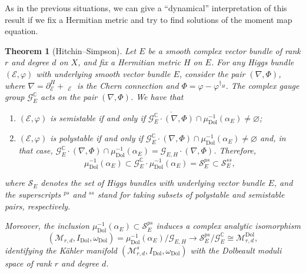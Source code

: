 \documentclass[12pt,a4paper]{amsbook}
\newtheorem{thm}{Theorem}[chapter]
\theoremstyle{remark} \newtheorem{rmk}[thm]{Remark}
\theoremstyle{definition} \newtheorem{defn}[thm]{Definition}
\theoremstyle{definition} \newtheorem{ex}[thm]{Example}
\theoremstyle{definition} \newtheorem{ej}{Exercise}
\newcommand{\C}{\mathbb C}
\newcommand{\cG}{\mathcal G}
\newcommand{\cM}{\mathcal M}
\newcommand{\cS}{\mathcal S}
\newcommand{\sE}{\mathscr E}
\newcommand{\Dol}{\mathrm{Dol}}
\DeclareMathOperator{\delbar}{\bar{\partial}}
\begin{document}
As in the previous situations, we can give a ``dynamical'' interpretation of this result if we fix a Hermitian metric and try to find solutions of the moment map equation.

\begin{thm}[Hitchin--Simpson]
Let $E$ be a smooth complex vector bundle of rank $r$ and degree $d$ on $X$, and fix a Hermitian metric $H$ on $E$.
For any Higgs bundle $(\sE,\varphi)$ with underlying smooth vector bundle $E$, consider the pair $(\nabla,\Phi)$, where $\nabla=\partial_{\sE}^{H} + \delbar_{\sE}$ is the Chern connection and $\Phi=\varphi-\varphi^{\dagger_H}$. The complex gauge group $\cG^{\C}_E$ acts on the pair $(\nabla,\Phi)$.
We have that
    \begin{enumerate}
\item $(\sE,\varphi)$ is semistable if and only if $\overline{\cG^\C_E \cdot (\nabla,\Phi)} \cap \mu_{\Dol}^{-1}(\alpha_E)\neq \varnothing$;
\item $(\sE,\varphi)$ is polystable if and only if $\cG^\C_E\cdot (\nabla,\Phi) \cap \mu_{\Dol}^{-1}(\alpha_E)\neq \varnothing$ and, in that case, $\cG^\C_E\cdot (\nabla,\Phi) \cap \mu_{\Dol}^{-1}(\alpha_E)=\cG_{E,H} \cdot (\nabla,\Phi)$. Therefore,
            \begin{equation*}
\mu_{\Dol}^{-1}(\alpha_E) \subset \cG^\C_E \cdot \mu_{\Dol}^{-1}(\alpha_E) = \cS_E^{ps} \subset \cS_E^{ss},
            \end{equation*}
    \end{enumerate}
    where $\cS_E$ denotes the set of Higgs bundles with underlying vector bundle $E$, and the superscripts $^{ps}$ and $^{ss}$ stand for taking subsets of polystable and semistable pairs, respectively.

Moreover, the inclusion $\mu_{\Dol}^{-1}(\alpha_E)\subset \cS_E^{ps}$ induces a complex analytic isomorphism
           \begin{equation*}
(\cM_{r,d},I_{\Dol},\omega_{\Dol})=\mu_{\Dol}^{-1}(\alpha_E)/\cG_{E,H} \longrightarrow \cS_E^{ps}/\cG_E^\C \cong \cM^{\Dol}_{r,d},
           \end{equation*}
           identifying the Kähler manifold $(\cM^s_{r,d},I_{\Dol},\omega_{\Dol})$ with the Dolbeault moduli space of rank $r$ and degree $d$.
\end{thm}
\end{document}
